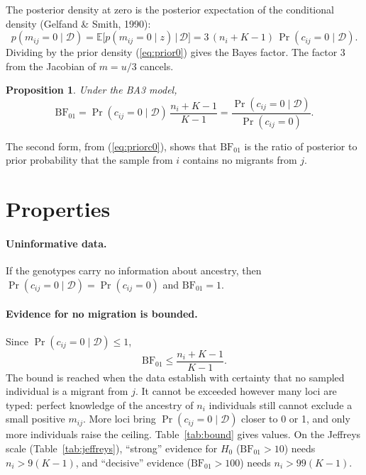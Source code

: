 \documentclass[11pt,a4paper]{article}
\newcommand{\E}{\mathbb{E}}
\newcommand{\BF}{\mathrm{BF}}
\newcommand{\data}{\mathcal{D}}
\newcommand{\1}{\mathbf{1}}
\newtheorem{proposition}{Proposition}
\begin{document}
The posterior density at zero is the posterior expectation of the conditional
density (Gelfand \& Smith, 1990):
\begin{equation}
p(m_{ij}=0 \mid \data) = \E\big[p(m_{ij}=0\mid z)\,\big|\,\data\big]
= 3\,(n_i+K-1)\,\Pr(c_{ij}=0 \mid \data).
\label{eq:post0}
\end{equation}
Dividing by the prior density (\ref{eq:prior0}) gives the Bayes factor. The
factor $3$ from the Jacobian of $m=u/3$ cancels.

\begin{proposition}
Under the BA3 model,
\begin{equation}
\boxed{\;\BF_{01} = \Pr(c_{ij}=0\mid\data)\,\frac{n_i+K-1}{K-1}
= \frac{\Pr(c_{ij}=0\mid\data)}{\Pr(c_{ij}=0)}.\;}
\label{eq:bf}
\end{equation}
\end{proposition}

The second form, from (\ref{eq:priorc0}), shows that $\BF_{01}$ is the ratio of
posterior to prior probability that the sample from $i$ contains no migrants
from $j$.

\section{Properties}
\label{sec:props}

\paragraph{Uninformative data.}
If the genotypes carry no information about ancestry, then
$\Pr(c_{ij}=0\mid\data)=\Pr(c_{ij}=0)$ and $\BF_{01}=1$.

\paragraph{Evidence for no migration is bounded.}
Since $\Pr(c_{ij}=0\mid\data)\le 1$,
\begin{equation}
\BF_{01} \le \frac{n_i+K-1}{K-1}.
\label{eq:bound}
\end{equation}
The bound is reached when the data establish with certainty that no sampled
individual is a migrant from $j$. It cannot be exceeded however many loci are
typed: perfect knowledge of the ancestry of $n_i$ individuals still cannot
exclude a small positive $m_{ij}$. More loci bring $\Pr(c_{ij}=0\mid\data)$
closer to 0 or 1, and only more individuals raise the ceiling.
Table~\ref{tab:bound} gives values. On the Jeffreys scale
(Table~\ref{tab:jeffreys}), ``strong'' evidence for $H_0$ ($\BF_{01}>10$)
needs $n_i > 9(K-1)$, and ``decisive'' evidence ($\BF_{01}>100$) needs
$n_i > 99(K-1)$.
\end{document}
